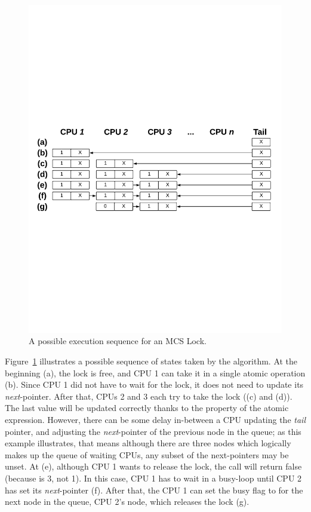 \begin{figure}
\begin{center}
\includegraphics[width=1\linewidth]{figs/mcslock/mcsex}
\end{center}
\caption{A possible execution sequence for an MCS Lock.}
\label{fig:mcs-example}
\end{figure}

Figure~\ref{fig:mcs-example} illustrates a possible sequence of states taken by the algorithm. 
At the beginning (a), the lock is free, and CPU 1 can take it in a single atomic  operation (b).
Since CPU 1 did not have to wait for the lock, it does not need to update its \emph{next}-pointer. 
After that, CPUs 2 and 3 each try to take the lock ((c) and (d)). 
The last value will be updated correctly thanks to the property of the atomic expression.
However, there can be some delay in-between a CPU updating the \emph{tail} pointer, and adjusting the \emph{next}-pointer of the previous node in the queue; as this example illustrates, that means although there are three nodes which logically makes up the queue of waiting CPUs, any subset of the next-pointers may be unset. 
At (e), although CPU 1 wants to release the lock, the 
call will return false (because  is 3, not 1).
In this case, CPU 1 has to wait in a busy-loop until CPU 2 has set its \emph{next}-pointer (f).
After that, the CPU 1 can set the busy flag to  for the next node in the queue, CPU 2's node, which releases the lock (g).

